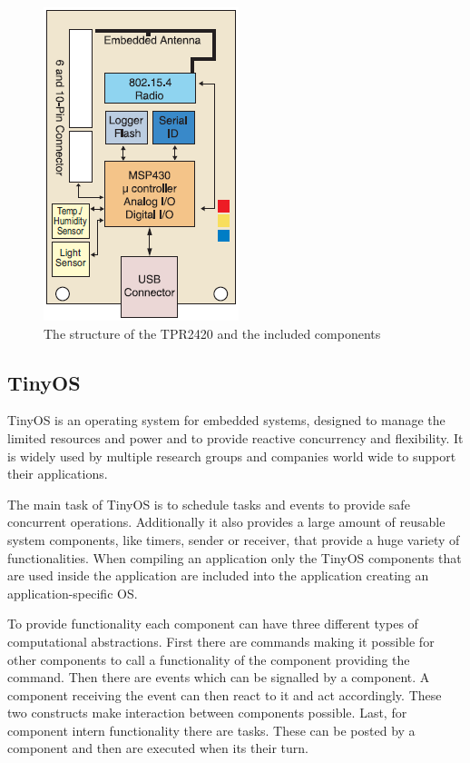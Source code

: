 \begin{figure}[htbp]
	\centering
    \includegraphics[scale=0.7]{content/images/Mote1}
   	\caption{The structure of the TPR2420 and the included components \cite{telosb}}
    \label{fig:telosb}
\end{figure}
 
\subsection{TinyOS}
TinyOS is an operating system for embedded systems, designed to manage the limited resources and power and to provide reactive concurrency and flexibility. It is widely used by multiple research groups and companies world wide to support their applications.

The main task of TinyOS is to schedule tasks and events to provide safe concurrent operations. Additionally it also provides a large amount of reusable system components, like timers, sender or receiver, that provide a huge variety of functionalities. When compiling an application only the TinyOS components that are used inside the application are included into the application creating an application-specific OS.

To provide functionality each component can have three different types of computational abstractions. First there are commands making it possible for other components to call a functionality of the component providing the command. Then there are events which can be signalled by a component. A component receiving the event can then react to it and act accordingly. These two constructs make interaction between components possible. Last, for component intern functionality there are tasks. These can be posted by a component and then are executed when its their turn. 

